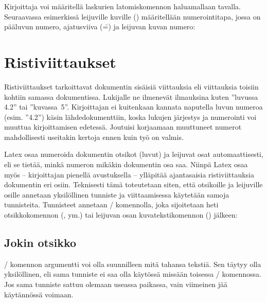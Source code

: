 Kirjoittaja voi määritellä laskurien latomiskomennon haluamallaan
tavalla. Seuraavassa esimerkissä leijuville kuville ()
määritellään numerointitapa, jossa on pääluvun numero, ajatusviiva (\==)
ja leijuvan kuvan numero:

\begin{koodilohkosis}
\renewcommand{\thefigure}{\thechapter--\arabic{figure}}
\end{koodilohkosis}

\section{Ristiviittaukset}
\label{luku/ristiviitteet}

Ristiviittaukset tarkoittavat dokumentin sisäisiä viittauksia eli
viittauksia toisiin kohtiin samassa dokumentissa. Lukijalle ne ilmenevät
ilmauksina kuten ''luvussa 4.2'' tai ''kuvassa~5''. Kirjoittajan ei
kuitenkaan kannata naputella luvun numeroa (esim. ''4.2'') käsin
lähdedokumenttiin, koska lukujen järjestys ja numerointi voi muuttua
kirjoittamisen edetessä. Joutuisi korjaamaan muuttuneet numerot
mahdollisesti useitakin kertoja ennen kuin työ on valmis.

Latex osaa numeroida dokumentin otsikot (luvut) ja leijuvat osat
automaattisesti, eli se tietää, minkä numeron mikäkin dokumentin osa
saa. Niinpä Latex osaa myös -- kirjoittajan pienellä avustuksella --
ylläpitää ajantasaisia ristiviittauksia dokumentin eri osiin. Teknisesti
tämä toteutetaan siten, että otsikoille ja leijuville osille annetaan
yksilöllinen tunniste ja viittaamisessa käytetään samoja tunnisteita.
Tunnisteet annetaan \-/ komennolla, joka sijoitetaan heti
otsikkokomennon (,  ym.) tai
leijuvan osan kuvatekstikomennon () jälkeen:

\begin{koodilohkosis}
\section{Jokin otsikko}
\label{tunniste}
\end{koodilohkosis}

\noindent
{}\-/ komennon argumentti  voi olla
suunnilleen mitä tahansa tekstiä. Sen täytyy olla yksilöllinen, eli sama
tunniste ei saa olla käytössä missään toisessa \-/
komennossa. Jos sama tunniste sattuu olemaan useassa paikassa, vain
viimeinen jää käytännössä voimaan.


